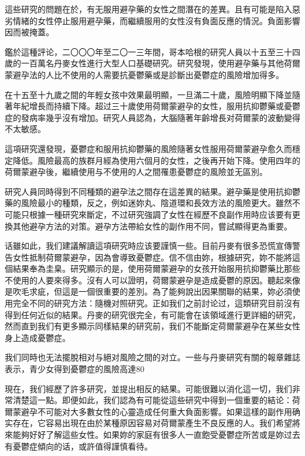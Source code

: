 \documentclass[12pt,UTF8]{ctexbook}
\begin{document}
這些研究的問題在於，有无服用避孕藥的女性之間潛在的差異。且有可能是陷入惡劣情緒的女性停止服用避孕藥，而繼續服用的女性沒有負面反應的情況。負面影響因而被掩蓋。

鑑於這種評论，二〇〇〇年至二〇一三年間，哥本哈根的研究人員以十五至三十四歲的一百萬名丹麥女性進行大型人口基礎研究。研究發現，使用避孕藥与其他荷爾蒙避孕法的人比不使用的人需要抗憂鬱藥或是診斷出憂鬱症的風險增加得多。

在十五至十九歲之間的年輕女孩中效果最明顯，一旦滿二十歲，風險明顯下降並隨著年紀增長而持續下降。超过三十歲使用荷爾蒙避孕的女性，服用抗抑鬱藥或憂鬱症的發病率幾乎沒有增加。研究人員認為，大腦隨著年齡增長对荷爾蒙的波動變得不太敏感。

這項研究還發現，憂鬱症和服用抗抑鬱藥的風險隨著女性服用荷爾蒙避孕愈久而穩定降低。風險最高的族群月經為使用六個月的女性，之後再开始下降。使用四年的荷爾蒙避孕後，繼續使用与不使用的人之間罹患憂鬱症的風險並无區別。

研究人員同時得到不同種類的避孕法之間存在這差異的結果。避孕藥是使用抗抑鬱藥的風險最小的種類，反之，例如迷妳丸、陰道環和長效方法的風險更大。雖然不可能只根據一種研究來斷定，不过研究強調了女性在經歷不良副作用時应该要有更換其他避孕方法的对策。避孕方法帶給女性的副作用不同，嘗試顯得更為重要。

话雖如此，我们建議解讀這項研究時应该要謹慎一些。目前丹麥有很多恐慌宣傳警告女性抵制荷爾蒙避孕，因為會導致憂鬱症。信不信由妳，根據研究，妳不能將這個結果奉為圭臬。研究顯示的是，使用荷爾蒙避孕的女孩开始服用抗抑鬱藥比那些不使用的人要來得多。沒有人可以證明，荷爾蒙避孕是造成憂鬱的原因。聽起來像是吹毛求疵，但這是一個很重要的差別。為了能夠說出因果關聯的結果，妳必須使用完全不同的研究方法：隨機对照研究。正如我们之前討论过，這類研究目前沒有得到任何近似的結果。丹麥的研究很完全，有可能會在该領域進行更詳細的研究，然而直到我们有更多顯示同樣結果的研究前，我们不能斷定荷爾蒙避孕在某些女性身上造成憂鬱症。

我们同時也无法擺脫相对与絕对風險之間的对立。一些与丹麥研究有關的報章雜誌表示，青少女得到憂鬱症的風險高達80%

現在，我们經歷了許多研究，並提出相反的結果。可能很難以消化這一切，我们非常清楚這一點。即便如此，我们認為有可能從這些研究中得到一個重要的結论：荷爾蒙避孕不可能对大多數女性的心靈造成任何重大負面影響。如果這樣的副作用确实存在，它容易出現在由於某種原因容易对荷爾蒙產生不良反應的人。我们希望將來能夠好好了解這些女性。如果妳的家庭有很多人一直飽受憂鬱症所苦或是妳过去有憂鬱症傾向的话，或許值得謹慎看待。
\end{document}
